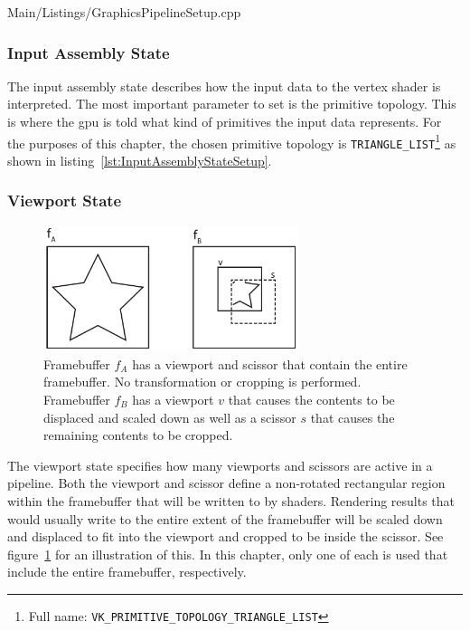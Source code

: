         
        {Main/Listings/GraphicsPipelineSetup.cpp}


      \subsubsection{Input Assembly State}
        The input assembly state describes how the input data to the vertex shader is interpreted.
        The most important parameter to set is the primitive topology.
        This is where the \gls{gpu} is told what kind of primitives the input data represents.
        For the purposes of this chapter, the chosen primitive topology is \lstinline{TRIANGLE_LIST}\footnote{Full name: \lstinline{VK_PRIMITIVE_TOPOLOGY_TRIANGLE_LIST}} as shown in listing~\ref{lst:InputAssemblyStateSetup}.

      \subsubsection{Viewport State}
      \label{sss:ViewportState}
        \begin{figure}
          \includegraphics[width=0.666\textwidth]{Main/Images/ViewportScissorSample}
          \centering
          \caption{Framebuffer {\large$f_A$} has a viewport and scissor that contain the entire framebuffer. No transformation or cropping is performed. Framebuffer {\large$f_B$} has a viewport {\large$v$} that causes the contents to be displaced and scaled down as well as a scissor {\large$s$} that causes the remaining contents to be cropped.}
          \label{fig:ViewportScissorSample}
        \end{figure}

        The viewport state specifies how many viewports and scissors are active in a pipeline.
        Both the viewport and scissor define a non-rotated rectangular region within the framebuffer that will be written to by shaders.
        Rendering results that would usually write to the entire extent of the framebuffer will be scaled down and displaced to fit into the viewport and cropped to be inside the scissor.
        See figure~\ref{fig:ViewportScissorSample} for an illustration of this.
        In this chapter, only one of each is used that include the entire framebuffer, respectively.

